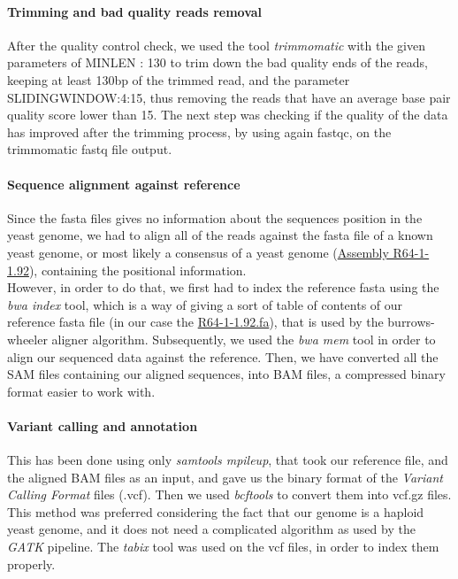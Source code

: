 \documentclass[10pt,a4paper]{article}
\begin{document}
\paragraph{Trimming and bad quality reads removal } After the quality control check, we used the tool \textit{trimmomatic}\cite{bolger_trimmomatic:_2014} with the given parameters of MINLEN : 130 to trim down the bad quality ends of the reads, keeping at least 130bp of the trimmed read, and the parameter SLIDINGWINDOW:4:15, thus removing the reads that have an average base pair quality score lower than 15. The next step was checking if the quality of the data has improved after the trimming process, by using again fastqc, on the trimmomatic fastq file output.

\paragraph{Sequence alignment against reference} Since the fasta files gives no information about the sequences position in the yeast genome, we had to align all of the reads against the fasta file of a known yeast genome, or most likely a consensus of a yeast genome (\href{https://www.ensembl.org/Saccharomyces_cerevisiae/Info/Index}{Assembly R64-1-1.92}), containing the positional information.\\
 
\noindent However, in order to do that, we first had to index the reference fasta using the \textit{bwa index} tool\cite{li_fast_2010}, which is a way of giving a sort of table of contents of our reference fasta file (in our case the \href{https://www.ensembl.org/Saccharomyces_cerevisiae/Info/Index}{R64-1-1.92.fa}), that is used by the burrows-wheeler aligner algorithm. Subsequently, we used the \textit{bwa mem} tool in order to align our sequenced data against the reference. Then, we have converted all the SAM\cite{li_sequence_2009} files containing our aligned sequences, into BAM files, a compressed binary format easier to work with.
 
\paragraph{Variant calling and annotation}
This has been done using only \textit{samtools mpileup}, that took our reference file, and the aligned BAM files as an input, and gave us the binary format of the \textit{Variant Calling Format} files (.vcf). Then we used \textit{bcftools} to convert them into vcf.gz files. This method was preferred considering the fact that our genome is a haploid yeast genome, and it does not need a complicated algorithm as used by the \textit{GATK} pipeline. The \textit{tabix}\cite{li_tabix:_2011} tool was used on the vcf files, in order to index them properly.\\
\end{document}
